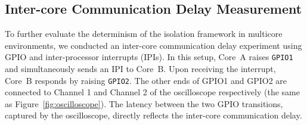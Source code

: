 \documentclass[letterpaper]{article}
\begin{document}
\begin{table}[t]
\centering
\caption{Latency comparison under different configurations (timestamp counter based), measured over a 24-hour period. Corresponding results are shown in Figures~\ref{fig:islcountergpio} and~\ref{fig:linuxcountergpio}.}
\label{tab:latency-comparison1}
\end{table}



\subsection{Inter-core Communication Delay Measurement}

To further evaluate the determinism of the isolation framework in multicore environments, we
conducted an inter-core communication delay experiment using GPIO and inter-processor interrupts (IPIs).
In this setup, Core~A raises \texttt{GPIO1} and simultaneously sends an IPI to Core~B. Upon receiving
the interrupt, Core~B responds by raising \texttt{GPIO2}.
The other ends of GPIO1 and GPIO2 are connected to Channel 1 and Channel 2 of the oscilloscope respectively
(the same as Figure~\ref{fig:oscilloscope}).
The latency between the two GPIO transitions,
captured by the oscilloscope, directly reflects the inter-core communication delay.


\begin{table}[t]
\centering
\caption{Latency comparison under different configurations (inter-core communication delay), measured over a 24-hour period. Corresponding results are shown in Figures~\ref{fig:islcrossgpio} and~\ref{fig:linuxcrossgpio}.}
\label{tab:latency-comparison3}
\end{table}
\end{document}

